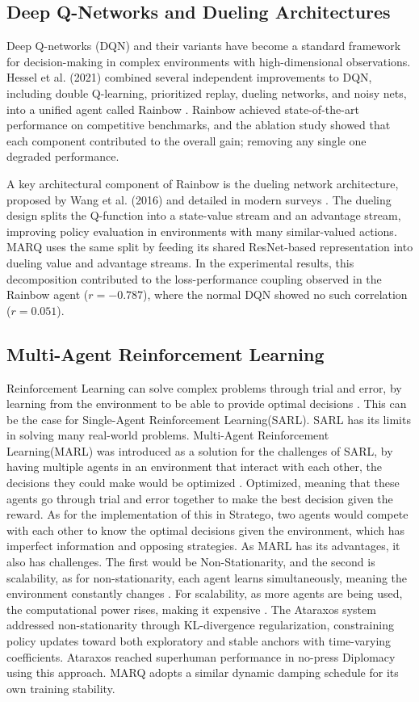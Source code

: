 \subsection{Deep Q-Networks and Dueling Architectures}
Deep Q-networks (DQN) and their variants have become a standard framework for decision-making in complex environments with high-dimensional observations. Hessel et al. (2021) combined several independent improvements to DQN, including double Q-learning, prioritized replay, dueling networks, and noisy nets, into a unified agent called Rainbow \cite{RainbowJMLR2021}. Rainbow achieved state-of-the-art performance on competitive benchmarks, and the ablation study showed that each component contributed to the overall gain; removing any single one degraded performance.

A key architectural component of Rainbow is the dueling network architecture, proposed by Wang et al. (2016) and detailed in modern surveys \cite{RainbowJMLR2021, DRLImperfectInfo2023}. The dueling design splits the Q-function into a state-value stream and an advantage stream, improving policy evaluation in environments with many similar-valued actions. MARQ uses the same split by feeding its shared ResNet-based representation into dueling value and advantage streams. In the experimental results, this decomposition contributed to the loss-performance coupling observed in the Rainbow agent ($r = -0.787$), where the normal DQN showed no such correlation ($r = 0.051$).


\subsection{Multi-Agent Reinforcement Learning}
Reinforcement Learning can solve complex problems through trial and error, by learning from the environment to be able to provide optimal decisions \cite{2509_03682v1}. This can be the case for Single-Agent Reinforcement Learning(SARL). SARL has its limits in solving many real-world problems. Multi-Agent Reinforcement Learning(MARL) was introduced as a solution for the challenges of SARL, by having multiple agents in an environment that interact with each other, the decisions they could make would be optimized \cite{2509_03682v1}. Optimized, meaning that these agents go through trial and error together to make the best decision given the reward. As for the implementation of this in Stratego, two agents would compete with each other to know the optimal decisions given the environment, which has imperfect information and opposing strategies.
As MARL has its advantages, it also has challenges. The first would be Non-Stationarity, and the second is scalability, as for non-stationarity, each agent learns simultaneously, meaning the environment constantly changes \cite{MARLCHALL}. For scalability, as more agents are being used, the computational power rises, making it expensive \cite{CFRMIX, MARLCHALL}. The Ataraxos system \cite{Ataraxos2025} addressed non-stationarity through KL-divergence regularization, constraining policy updates toward both exploratory and stable anchors with time-varying coefficients. Ataraxos reached superhuman performance in no-press Diplomacy using this approach. MARQ adopts a similar dynamic damping schedule for its own training stability.


